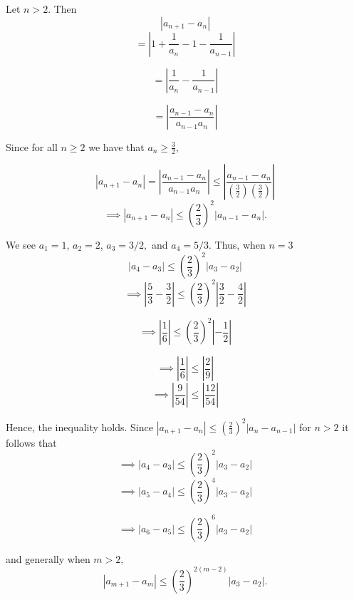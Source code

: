 \documentclass{report}
\begin{document}
\begin{myproof}
    
Let $n>2$. Then $$ \left| a_{n+1}  - a_{n} \right| $$
$$= \left| 1 + \frac{1}{a_{n}}  - 1 - \frac{1}{a_{n-1}} \right| $$

$$= \left|\frac{1}{a_{n}}  - \frac{1}{a_{n-1}} \right| $$

$$= \left|\frac{ a_{n-1 } - a_n }{a_{n-1} a_n}   \right| $$

Since for all $n\geq2$ we have that $a_n \geq \frac{3}{2},$

$$ \left| a_{n+1}  - a_{n} \right| =\left|\frac{ a_{n-1 } - a_n }{a_{n-1} a_n}\right| \leq \left|\frac{ a_{n-1 } - a_n }{\left(\frac{3}{2}\right) \left(\frac{3}{2}\right)}\right|$$
$$ \implies \left| a_{n+1}  - a_{n} \right|  \leq \left(\frac{2}{3}\right)^2\left|a_{n-1 } - a_n \right|.$$

\end{myproof}

\pagebreak
{}

\sol
\begin{myproof}
    
We see $a_1 = 1$, $a_2 = 2$, $a_3 = 3/2,$ and $a_4 = 5/3$.  Thus, when $n=3$
$$\left|a_4 - a_3 \right| \leq \left(\frac{2}{3} \right)^2 \left|a_3 - a_2 \right|$$
$$\implies \left|\frac{5}{3} - \frac{3}{2} \right| \leq \left(\frac{2}{3} \right)^2 \left|\frac{3}{2} - \frac{4}{2} \right|$$

$$\implies \left|\frac{1}{6}  \right| \leq \left(\frac{2}{3} \right)^2 \left| - \frac{1}{2} \right|$$

$$\implies \left|\frac{1}{6}  \right| \leq \left|\frac{2}{9} \right|$$
$$\implies \left|\frac{9}{54}  \right| \leq \left|\frac{12}{54} \right|$$

Hence, the inequality holds. Since $\left|a_{n+1}-a_n\right| \leq\left(\frac{2}{3}\right)^2\left|a_n-a_{n-1}\right|$ for $n>2$ it follows that
$$\implies \left|a_{4} - a_3\right| \leq \left(\frac{2}{3}\right)^2 \left|a_3 -a_2\right|$$
$$\implies \left|a_{5} - a_4\right| \leq \left(\frac{2}{3}\right)^4 \left|a_3 -a_2\right|$$

$$\implies \left|a_{6} - a_5\right| \leq \left(\frac{2}{3}\right)^6 \left|a_3 -a_2\right|$$

and generally when $m>2,$
$$ \left|a_{m+1} - a_m\right| \leq \left(\frac{2}{3}\right)^{2(m-2)} \left|a_3 -a_2\right|.$$

\end{myproof}
\pagebreak
{}
\end{document}
